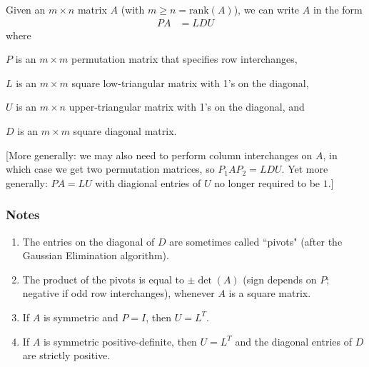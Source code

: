 Given an $m\times n$ matrix $A$ (with $m \geq n = \text{rank}(A)$), we can write $A$ in the form 
\begin{align*}
    PA &= LDU
\end{align*}
where 
\begin{description}
    \item \quad $P$ is an $m\times m$ permutation matrix that specifies row interchanges, 
    \item \quad $L$ is an $m\times m$ square low-triangular matrix with 1's on the diagonal, 
    \item \quad $U$ is an $m\times n$ upper-triangular matrix with 1's on the diagonal, and 
    \item \quad $D$ is an $m\times m$ square diagonal matrix.
\end{description}

[More generally: we may also need to perform column interchanges on $A$, in which case we get two permutation matrices, so $P_1 A P_2 = LDU$. Yet more generally: $PA=LU$ with diagional entries of $U$ no longer required to be $1$.]

\subsubsection*{Notes}
\begin{enumerate}
    \item The entries on the diagonal of $D$ are sometimes called ``pivots" (after the Gaussian Elimination algorithm). 
    \item The product of the pivots is equal to $\pm\det(A)$ (sign depends on $P$; negative if odd row interchanges), whenever $A$ is a square matrix.
    \item If $A$ is symmetric and $P=I$, then $U=L^T$.
    \item If $A$ is symmetric positive-definite, then $U=L^T$ and the diagonal entries of $D$ are strictly positive.
\end{enumerate}

